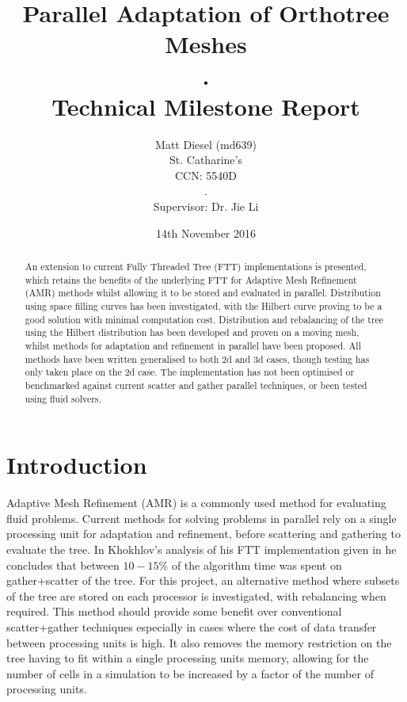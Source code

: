 \documentclass[12pt]{article}
\begin{document}
\sloppy
\title{Parallel Adaptation of Orthotree Meshes \\ . \\ Technical Milestone Report}
\date{14th November 2016}
\author{Matt Diesel (md639) \\ St. Catharine's \\ CCN: 5540D \\ . \\ Supervisor: Dr. Jie Li}

% 

\maketitle

\begin{abstract}
An extension to current Fully Threaded Tree (FTT) implementations is presented, which retains the benefits of the underlying FTT for Adaptive Mesh Refinement (AMR) methods whilst allowing it to be stored and evaluated in parallel. Distribution using space filling curves has been investigated, with the Hilbert curve proving to be a good solution with minimal computation cost. Distribution and rebalancing of the tree using the Hilbert distribution has been developed and proven on a moving mesh, whilst methods for adaptation and refinement in parallel have been proposed. All methods have been written generalised to both 2d and 3d cases, though testing has only taken place on the 2d case. The implementation has not been optimised or benchmarked against current scatter and gather parallel techniques, or been tested using fluid solvers. 
\end{abstract}

\section{Introduction}
Adaptive Mesh Refinement (AMR) is a commonly used method for evaluating fluid problems. Current methods for solving problems in parallel rely on a single processing unit for adaptation and refinement, before scattering and gathering to evaluate the tree. In Khokhlov's analysis of his FTT implementation given in \cite{Khokhlov98} he concludes that between $10-15\%$ of the algorithm time was spent on gather+scatter of the tree. For this project, an alternative method where subsets of the tree are stored on each processor is investigated, with rebalancing when required. This method should provide some benefit over conventional scatter+gather techniques especially in cases where the cost of data transfer between processing units is high. It also removes the memory restriction on the tree having to fit within a single processing units memory, allowing for the number of cells in a simulation to be increased by a factor of the number of processing units. 
\end{document}
